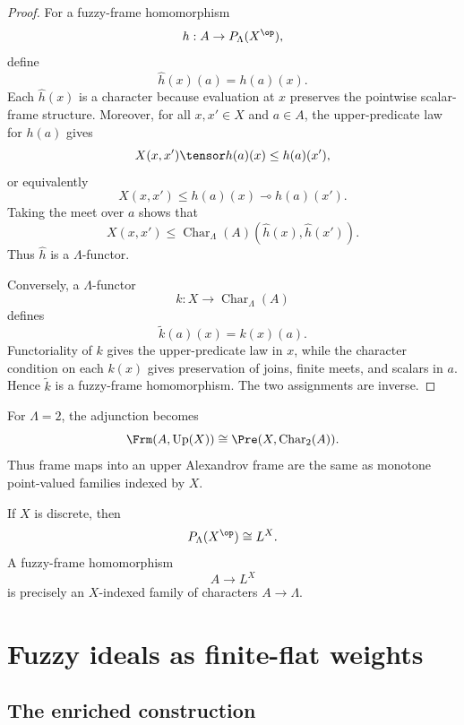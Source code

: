 \begin{proof}
For a fuzzy-frame homomorphism
\[
    h:A\to P_\Lambda(X^{\op}),
\]
define
\[
    \widehat h(x)(a)=h(a)(x).
\]
Each \(\widehat h(x)\) is a character because evaluation at \(x\) preserves the
pointwise scalar-frame structure.  Moreover, for all \(x,x'\in X\) and \(a\in A\),
the upper-predicate law for \(h(a)\) gives
\[
    X(x,x')\tensor h(a)(x)\leq h(a)(x'),
\]
or equivalently
\[
    X(x,x')\leq h(a)(x)\multimap h(a)(x').
\]
Taking the meet over \(a\) shows that
\[
    X(x,x')
    \leq
    \operatorname{Char}_\Lambda(A)(\widehat h(x),\widehat h(x')).
\]
Thus \(\widehat h\) is a \(\Lambda\)-functor.

Conversely, a \(\Lambda\)-functor
\[
    k:X\to\operatorname{Char}_\Lambda(A)
\]
defines
\[
    \widetilde k(a)(x)=k(x)(a).
\]
Functoriality of \(k\) gives the upper-predicate law in \(x\), while the character
condition on each \(k(x)\) gives preservation of joins, finite meets, and scalars
in \(a\).  Hence \(\widetilde k\) is a fuzzy-frame homomorphism.  The two
assignments are inverse.
\end{proof}

\begin{example}
\label{ex:upper-character-adjunction-crisp}
For \(\Lambda=2\), the adjunction becomes
\[
    \Frm(A,\operatorname{Up}(X))
    \cong
    \Pre(X,\operatorname{Char}_2(A)).
\]
Thus frame maps into an upper Alexandrov frame are the same as monotone
point-valued families indexed by \(X\).
\end{example}

\begin{example}
\label{ex:upper-character-adjunction-discrete}
If \(X\) is discrete, then
\[
    P_\Lambda(X^{\op})\cong L^X.
\]
A fuzzy-frame homomorphism
\[
    A\to L^X
\]
is precisely an \(X\)-indexed family of characters \(A\to\Lambda\).
\end{example}

\section{Fuzzy ideals as finite-flat weights}
\label{sec:fuzzy-ideals-flat-weights}

\subsection{The enriched construction}
\label{subsec:fuzzy-ideals-enriched}

